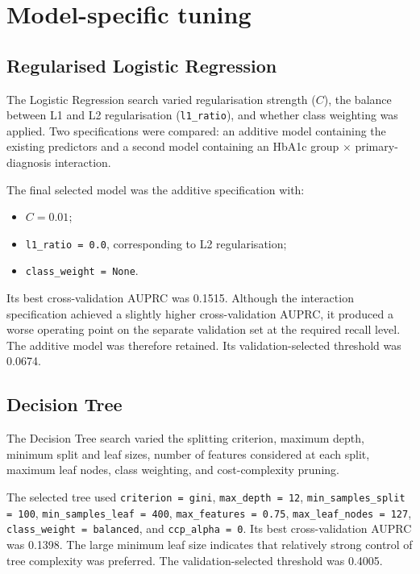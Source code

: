 \documentclass[11pt,a4paper]{article}
\begin{document}
\section{Model-specific tuning}

\subsection{Regularised Logistic Regression}

The Logistic Regression search varied regularisation strength ($C$), the balance between L1 and L2 regularisation (\texttt{l1\_ratio}), and whether class weighting was applied. Two specifications were compared: an additive model containing the existing predictors and a second model containing an HbA1c group $\times$ primary-diagnosis interaction.

The final selected model was the additive specification with:

\begin{itemize}
    \item $C = 0.01$;
    \item \texttt{l1\_ratio = 0.0}, corresponding to L2 regularisation;
    \item \texttt{class\_weight = None}.
\end{itemize}

Its best cross-validation AUPRC was 0.1515. Although the interaction specification achieved a slightly higher cross-validation AUPRC, it produced a worse operating point on the separate validation set at the required recall level. The additive model was therefore retained. Its validation-selected threshold was 0.0674.

\subsection{Decision Tree}

The Decision Tree search varied the splitting criterion, maximum depth, minimum split and leaf sizes, number of features considered at each split, maximum leaf nodes, class weighting, and cost-complexity pruning.

The selected tree used \texttt{criterion = gini}, \texttt{max\_depth = 12}, \texttt{min\_samples\_split = 100}, \texttt{min\_samples\_leaf = 400}, \texttt{max\_features = 0.75}, \texttt{max\_leaf\_nodes = 127}, \texttt{class\_weight = balanced}, and \texttt{ccp\_alpha = 0}. Its best cross-validation AUPRC was 0.1398. The large minimum leaf size indicates that relatively strong control of tree complexity was preferred. The validation-selected threshold was 0.4005.
\end{document}
